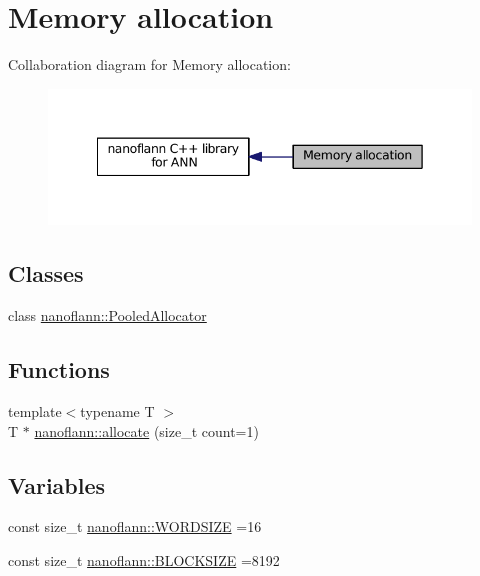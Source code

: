 \hypertarget{group__memalloc__grp}{\section{Memory allocation}
\label{group__memalloc__grp}
}
Collaboration diagram for Memory allocation\-:\nopagebreak
\begin{figure}[H]
\begin{center}
\leavevmode
\includegraphics[width=342pt]{group__memalloc__grp}
\end{center}
\end{figure}
\subsection*{Classes}
\begin{DoxyCompactItemize}
\item 
class \hyperlink{classnanoflann_1_1_pooled_allocator}{nanoflann\-::\-Pooled\-Allocator}
\end{DoxyCompactItemize}
\subsection*{Functions}
\begin{DoxyCompactItemize}
\item 
{\footnotesize template$<$typename T $>$ }\\T $\ast$ \hyperlink{group__memalloc__grp_ga477667da2a8edb1d65f5a7eebaffc1eb}{nanoflann\-::allocate} (size\-\_\-t count=1)
\end{DoxyCompactItemize}
\subsection*{Variables}
\begin{DoxyCompactItemize}
\item 
const size\-\_\-t \hyperlink{group__memalloc__grp_ga40956ef8f797399b4f478df9fc1566f4}{nanoflann\-::\-W\-O\-R\-D\-S\-I\-Z\-E} =16
\item 
const size\-\_\-t \hyperlink{group__memalloc__grp_gaf4df087b6f47e514f6062f7ada2d19d7}{nanoflann\-::\-B\-L\-O\-C\-K\-S\-I\-Z\-E} =8192
\end{DoxyCompactItemize}



